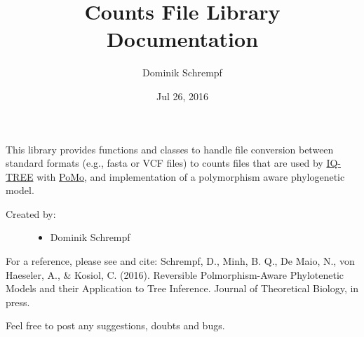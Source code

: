 \documentclass[letterpaper,10pt,english]{sphinxmanual}
\title{Counts File Library Documentation}
\date{Jul 26, 2016}
\author{Dominik Schrempf}
\begin{document}
\maketitle
\tableofcontents
{}\label{index::doc}


This library provides functions and classes to handle file conversion
between standard formats (e.g., fasta or VCF files) to counts files
that are used by \href{http://www.cibiv.at/software/iqtree/}{IQ-TREE}
with \href{http://www.cibiv.at/software/iqtree/doc/Polymorphism-Aware-Models/}{PoMo},
and implementation of a polymorphism aware phylogenetic model.
\begin{description}
\item[{Created by:}] \leavevmode\begin{itemize}
\item {} 
Dominik Schrempf

\end{itemize}

\end{description}

For a reference, please see and cite: Schrempf, D., Minh, B. Q., De
Maio, N., von Haeseler, A., \& Kosiol, C. (2016). Reversible
Polmorphism-Aware Phylotenetic Models and their Application to Tree
Inference. Journal of Theoretical Biology, in press.

Feel free to post any suggestions, doubts and bugs.
\end{document}
